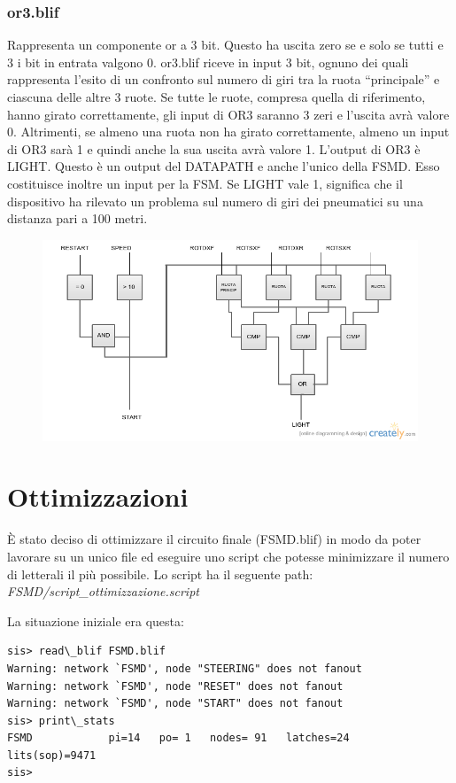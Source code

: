 \documentclass[a4paper,titlepage]{book}
\begin{document}
\subsection{or3.blif}

Rappresenta un componente or a 3 bit. Questo ha uscita zero se e solo se tutti e 3 i bit in  entrata valgono 0.  or3.blif riceve in input 3 bit, ognuno dei quali rappresenta l’esito di un confronto sul  numero di giri tra la ruota “principale” e ciascuna delle altre 3 ruote.  Se tutte le ruote, compresa quella di riferimento, hanno girato correttamente, gli input di  OR3 saranno 3 zeri e l’uscita avrà valore 0.  Altrimenti, se almeno una ruota non ha girato correttamente, almeno un input di OR3 sarà  1 e quindi anche la sua uscita avrà valore 1.  L’output di OR3 è LIGHT. Questo è un output del DATAPATH e anche l’unico della FSMD.  Esso costituisce inoltre un input per la FSM.  Se LIGHT vale 1, significa che il dispositivo ha rilevato un problema sul numero di giri dei  pneumatici su una distanza pari a 100 metri.


\begin{figure}[!h]
\centering
\includegraphics[scale=0.5]{datapath.png}
\end{figure}
\chapter{Ottimizzazioni}

È stato deciso di ottimizzare il circuito finale (FSMD.blif) in modo da poter lavorare su un unico file ed eseguire uno script che potesse minimizzare il numero di letterali il più possibile.
Lo script ha il seguente path: \textit{FSMD/script\_ottimizzazione.script}

La situazione iniziale era questa:

\begin{lstlisting}
sis> read\_blif FSMD.blif
Warning: network `FSMD', node "STEERING" does not fanout
Warning: network `FSMD', node "RESET" does not fanout
Warning: network `FSMD', node "START" does not fanout
sis> print\_stats
FSMD          	pi=14	po= 1	nodes= 91	latches=24
lits(sop)=9471
sis>
\end{lstlisting}
\end{document}
